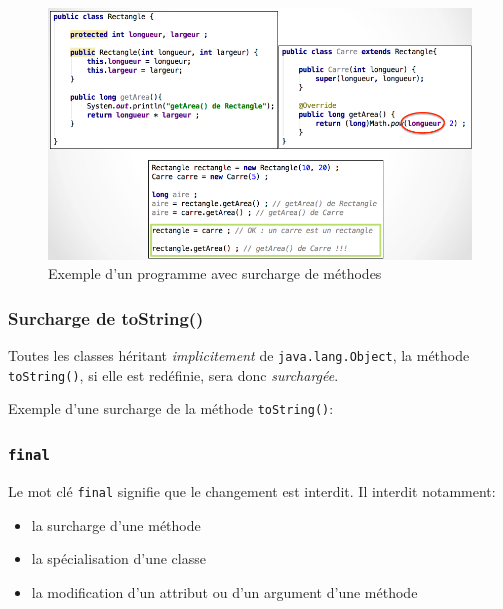 				
				\begin{figure}[h]
					\centering
					\includegraphics[width=1.0\linewidth]{images/exemplesurcharge}
					\caption{Exemple d'un programme avec surcharge de méthodes}
					\label{fig:exemplesurcharge}
				\end{figure}
				
			
			\subsubsection{Surcharge de toString()}
			
				Toutes les classes héritant \emph{implicitement} de \lstinline|java.lang.Object|, la méthode \lstinline|toString()|, si elle est redéfinie, sera donc \emph{surchargée}.
				
				\begin{exemple}
					Exemple d'une surcharge de la méthode \lstinline|toString()|:
					
				\end{exemple}
			
			\subsubsection{\lstinline|final|}
			
				Le mot clé \lstinline|final| signifie que le changement est interdit.
				Il interdit notamment:
				\begin{itemize}
					\item la surcharge d'une méthode
					\item la spécialisation d'une classe
					\item la modification d'un attribut ou d'un argument d'une méthode
				\end{itemize}
			
